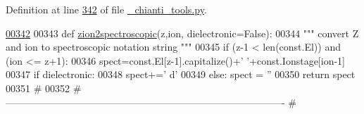 Definition at line \hyperlink{__chianti__tools_8py_source_l00342}{342} of file \hyperlink{__chianti__tools_8py_source}{\-\_\-chianti\-\_\-tools.\-py}.


\begin{DoxyCode}
\hypertarget{namespacepyneb_1_1utils_1_1__chianti__tools_l00342}{}\hyperlink{namespacepyneb_1_1utils_1_1__chianti__tools_a4c5a7ace6a222c4cfad8f00cf2b68554}{00342} 
00343 \textcolor{keyword}{def }\hyperlink{namespacepyneb_1_1utils_1_1__chianti__tools_a4c5a7ace6a222c4cfad8f00cf2b68554}{zion2spectroscopic}(z,ion, dielectronic=False):
00344     \textcolor{stringliteral}{""" convert Z and ion to spectroscopic notation string """}
00345     \textcolor{keywordflow}{if} (z-1 < len(const.El)) \textcolor{keywordflow}{and} (ion <= z+1):
00346         spect=const.El[z-1].capitalize()+\textcolor{stringliteral}{' '}+const.Ionstage[ion-1]
00347         \textcolor{keywordflow}{if} dielectronic:
00348             spect+=\textcolor{stringliteral}{' d'}
00349     \textcolor{keywordflow}{else}:  spect = \textcolor{stringliteral}{''}
00350     \textcolor{keywordflow}{return} spect
00351     \textcolor{comment}{#}
00352     \textcolor{comment}{# -------------------------------------------------------------------------------------}
    \textcolor{comment}{#}
\end{DoxyCode}
